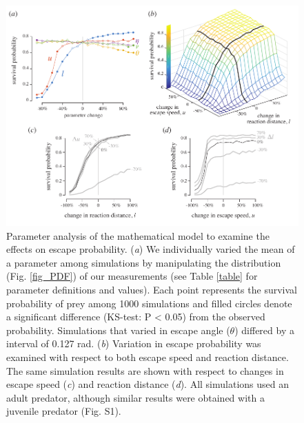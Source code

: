 \documentclass[]{rsos}%
\begin{document}
\begin{figure}[!h]
\centering
	\includegraphics[width=5.5in]{fig_sensitivity}
\caption{Parameter analysis of the mathematical model to examine the effects on escape probability.  
(\textit{a}) We individually varied the mean of a parameter among simulations by manipulating the distribution (Fig. \ref{fig_PDF}) of our measurements (see Table \ref{table} for parameter definitions and values). 
Each point represents the survival probability of prey among 1000 simulations and filled circles denote a significant difference (KS-test: P < 0.05) from the observed probability.
Simulations that varied in escape angle ($\theta$) differed by a interval of 0.127 rad.
(\textit{b}) Variation in escape probability was examined with respect to both escape speed and reaction distance.
The same simulation results are shown with respect to changes in escape speed (\textit{c}) and reaction distance (\textit{d}). All simulations used an adult predator, although similar results were obtained with a juvenile predator (Fig. S1).
}
\label{fig_sense}
\end{figure}

\pagebreak
\end{document}
